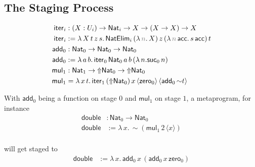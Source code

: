 \documentclass[handout]{beamer}
\newenvironment{fr}[1][]
{\begin{frame}[fragile,environment=fr,#1]}
{\end{frame}}
\begin{document}
\subsection{The Staging Process}
\begin{fr}{\subsecname}
$$
\begin{aligned}
\mathsf{iter}_i&:(X:U_i)\to\mathsf{Nat}_i\to X\to (X\to X)\to X\\
\mathsf{iter}_i&:=\lambda\,X\,t\,z\,s.\,\mathsf{NatElim}_i\,(\lambda\,\gray n.\,X)\,z\,(\lambda\,\gray n\,\mathsf{acc}.\,s\,\mathsf{acc})\,t\\
\mathsf{add}_0&:\mathsf{Nat}_0\to\mathsf{Nat}_0\to\mathsf{Nat}_0\\
\mathsf{add}_0&:=\lambda\,a\,b.\,\mathsf{iter}_0\,\mathsf{Nat}_0\,a\,b\,(\lambda\,n.\mathsf{suc}_0\,n)\\
\mathsf{mul}_1&:\mathsf{Nat}_1\to{\Uparrow}\mathsf{Nat}_0\to{\Uparrow}\mathsf{Nat}_0\\
\mathsf{mul}_1&=\lambda\,x\,t.\,\mathsf{iter}_1\,({\Uparrow}\mathsf{Nat}_0)\,x\,\langle\mathsf{zero}_0\rangle\,\langle \mathsf{add}_0\,{\sim}t\rangle\\
\end{aligned}
$$


\pause With $\mathsf{add}_0$ being a function on stage $0$ and $\mathsf{mul}_1$ on stage $1$, a metaprogram, for instance\pause
$$
\begin{aligned}
    \mathsf{double}&:\mathsf{Nat}_0\to\mathsf{Nat}_0\\
    \mathsf{double}&:=\lambda\,x.\,{\sim}(\mathsf{mul}_1\,2\,\langle x\rangle)\\
\end{aligned}
$$

will get staged to \pause 
$$
\begin{aligned}
    \mathsf{double}&:=\lambda\,x.\,\mathsf{add}_0\,x\,(\mathsf{add}_0\,x\,\mathsf{zero}_0)
\end{aligned}
$$
\end{fr}



\end{document}
